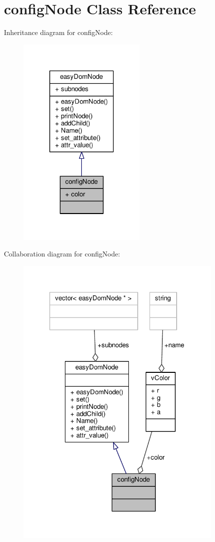\hypertarget{classconfigNode}{}\section{config\+Node Class Reference}
\label{classconfigNode}


Inheritance diagram for config\+Node\+:
\nopagebreak
\begin{figure}[H]
\begin{center}
\leavevmode
\includegraphics[width=177pt]{d7/d95/classconfigNode__inherit__graph}
\end{center}
\end{figure}


Collaboration diagram for config\+Node\+:
\nopagebreak
\begin{figure}[H]
\begin{center}
\leavevmode
\includegraphics[width=286pt]{d5/d4d/classconfigNode__coll__graph}
\end{center}
\end{figure}
